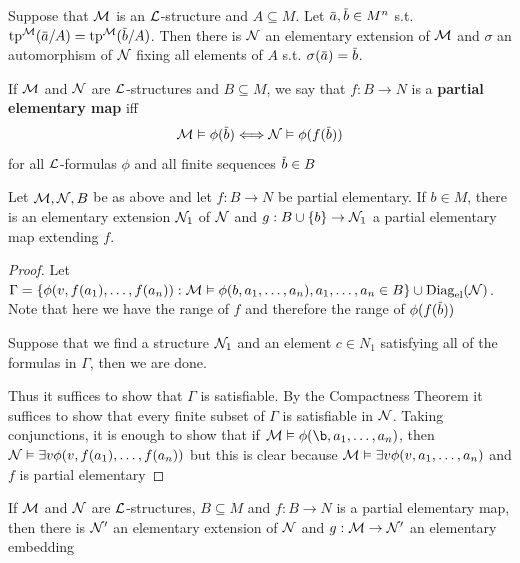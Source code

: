\documentclass[11pt]{article}
\begin{document}
\begin{proposition}[]
\label{prop4.1.5}
Suppose that \(\mathcal{M}\) is an \(\mathcal{L}\)-structure and \(A\subseteq M\). Let \(\bara,\barb\in M^n\)
s.t. \(\tp^{\calm}(\bara/A)=\tp^{\calm}(\barb/A)\). Then there is \(\mathcal{N}\) an elementary extension of \(\mathcal{M}\)
and \(\sigma\) an automorphism of \(\mathcal{N}\) fixing all elements of \(A\) s.t. \(\sigma(\bara)=\barb\).
\end{proposition}


If \(\mathcal{M}\) and \(\mathcal{N}\) are \(\mathcal{L}\)-structures and \(B\subseteq M\), we say that \(f:B\to N\) is a \textbf{partial}
\textbf{elementary map} iff
\begin{equation*}
\calm\vDash\phi(\barb)\Longleftrightarrow\caln\vDash\phi(f(\barb))
\end{equation*}
for all \(\mathcal{L}\)-formulas \(\phi\) and all finite sequences \(\barb\in B\)

\begin{lemma}[]
\label{lemma4.1.6}
Let \(\mathcal{M},\mathcal{N},B\) be as above and let \(f:B\to N\) be partial elementary. If \(b\in M\), there is an
elementary extension \(\mathcal{N}_1\) of \(\mathcal{N}\) and \(g:B\cup\{b\}\to \mathcal{N}_1\) a partial elementary map extending \(f\).
\end{lemma}

\begin{proof}
Let \(\Gamma=\{\phi(v,f(a_1),\dots,f(a_n)):\mathcal{M}\vDash\phi(b,a_1,\dots,a_n),a_1,\dots,a_n\in B\}\cup\operatorname{Diag}_{\operatorname{el}}(\mathcal{N})\). Note that here we
have the range of \(f\) and therefore the range of \(\phi(f(\barb))\)

Suppose that we find a structure \(\mathcal{N}_1\) and an element \(c\in N_1\) satisfying all of the formulas
in \(\Gamma\), then we are done.

Thus it suffices to show that \(\Gamma\) is satisfiable. By the Compactness Theorem it suffices to show
that every finite subset of \(\Gamma\) is satisfiable in \(\mathcal{N}\). Taking conjunctions, it is enough to show
that if \(\calm\vDash\phi(\b,a_1,\dots,a_n)\), then \(\mathcal{N}\vDash\exists v\phi(v,f(a_1),\dots,f(a_n))\) but this is clear because
\(\mathcal{M}\vDash\exists v\phi(v,a_1,\dots,a_n)\) and \(f\) is partial elementary
\end{proof}

\begin{corollary}[]
\label{cor4.1.7}
If \(\mathcal{M}\) and \(\mathcal{N}\) are \(\mathcal{L}\)-structures, \(B\subseteq M\) and \(f:B\to N\) is a partial elementary map,
then there is \(\mathcal{N}'\) an elementary extension of \(\mathcal{N}\) and \(g:\mathcal{M}\to\mathcal{N}'\) an elementary embedding
\end{corollary}
\end{document}

